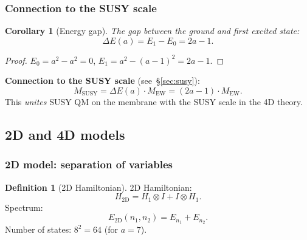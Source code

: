 \documentclass[11pt,a4paper]{article}
\newtheorem{corollary}[theorem]{Corollary}
\theoremstyle{definition}
\newtheorem{definition}[theorem]{Definition}
\begin{document}
\subsubsection{Connection to the SUSY scale}

\begin{corollary}[Energy gap]
\label{cor:membrane-gap}
The gap between the ground and first excited state:
\begin{equation}
    \boxed{
    \Delta E(a) = E_1 - E_0 = 2a - 1.
    }
    \label{eq:membrane-deltaE}
\end{equation}
\end{corollary}

\begin{proof}
$E_0 = a^2 - a^2 = 0$, $E_1 = a^2 - (a-1)^2 = 2a - 1$.
\end{proof}

\medskip\noindent
\textbf{Connection to the SUSY scale} (see~\S\ref{sec:susy}):
\begin{equation}
    M_{\text{SUSY}} = \Delta E(a) \cdot M_{\text{EW}} = (2a-1) \cdot M_{\text{EW}}.
    \label{eq:membrane-MSUSY-link}
\end{equation}
This \emph{unites} SUSY QM on the membrane with the SUSY scale
in the 4D theory.

\subsection{2D and 4D models}
\label{subsec:membrane-2D-4D}

\subsubsection{2D model: separation of variables}

\begin{definition}[2D Hamiltonian]
\label{def:membrane-2D}
2D Hamiltonian:
\begin{equation}
    H_{\text{2D}} = H_1 \otimes I + I \otimes H_1.
    \label{eq:membrane-H2D}
\end{equation}
Spectrum:
\begin{equation}
    E_{\text{2D}}(n_1, n_2) = E_{n_1} + E_{n_2}.
    \label{eq:membrane-spectrum-2D}
\end{equation}
Number of states: $8^2 = 64$ (for $a = 7$).
\end{definition}
\end{document}
